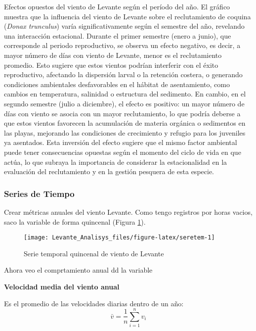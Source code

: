 \documentclass[
]{article}
\begin{document}
Efectos opuestos del viento de Levante según el período del año. El gráfico muestra que la influencia del viento de Levante sobre el reclutamiento de coquina (\emph{Donax trunculus}) varía significativamente según el semestre del año, revelando una interacción estacional. Durante el primer semestre (enero a junio), que corresponde al periodo reproductivo, se observa un efecto negativo, es decir, a mayor número de días con viento de Levante, menor es el reclutamiento promedio. Esto sugiere que estos vientos podrían interferir con el éxito reproductivo, afectando la dispersión larval o la retención costera, o generando condiciones ambientales desfavorables en el hábitat de asentamiento, como cambios en temperatura, salinidad o estructura del sedimento. En cambio, en el segundo semestre (julio a diciembre), el efecto es positivo: un mayor número de días con viento se asocia con un mayor reclutamiento, lo que podría deberse a que estos vientos favorecen la acumulación de materia orgánica o sedimentos en las playas, mejorando las condiciones de crecimiento y refugio para los juveniles ya asentados. Esta inversión del efecto sugiere que el mismo factor ambiental puede tener consecuencias opuestas según el momento del ciclo de vida en que actúa, lo que subraya la importancia de considerar la estacionalidad en la evaluación del reclutamiento y en la gestión pesquera de esta especie.

\newpage

\subsubsection{Series de Tiempo}\label{series-de-tiempo}

Crear métricas anuales del viento Levante. Como tengo registros por horas vacios, saco la variable de forma quincenal (Figura \ref{fig:seretem}).

\begin{figure}

{\centering \texttt{[image: Levante\_Analisys\_files/figure-latex/seretem-1]} 

}

\caption{Serie temporal quincenal de viento de Levante}\label{fig:seretem}
\end{figure}

Ahora veo el comprtamiento anual dd la variable

\textbf{Velocidad media del viento anual}

Es el promedio de las velocidades diarias dentro de un año:
\[
\bar{v} = \frac{1}{n} \sum_{i=1}^{n} v_i
\]
\end{document}
